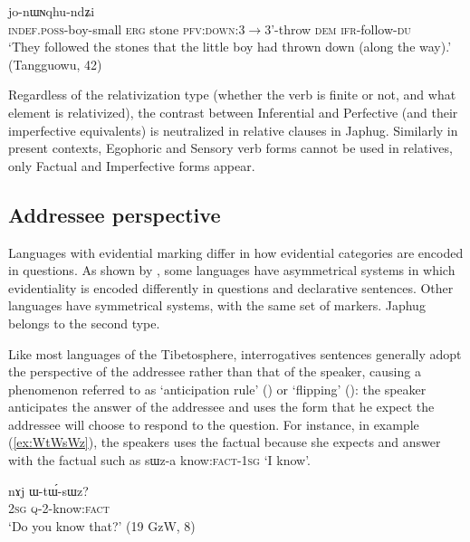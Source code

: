 \documentclass[oldfontcommands,oneside,a4paper,11pt]{article}
\newcommand{\ipa}[1]{{\phon \mbox{#1}}} %
\newcommand{\refb}[1]{(\ref{#1})}
\begin{document}
\begin{exe}
\ex  \label{ex:paBde}
\gll  [\ipa{tɤ-tɕɯ-pɯ} 	\ipa{kɯ} 	\ipa{rdɤstaʁ} 	\ipa{pa-βde}] 	\ipa{nɯ} 	\ipa{jo-nɯɴqhu-ndʑi}  \\
\textsc{indef.poss}-boy-small \textsc{erg} stone \textsc{pfv:down}:3$\rightarrow$3'-throw \textsc{dem} \textsc{ifr}-follow-\textsc{du} \\
\glt `They followed the stones that the little boy had thrown down (along the way).' (Tangguowu, 42)
\end{exe}

Regardless of the relativization type (whether the verb is finite or not, and what element is relativized), the contrast between Inferential and  Perfective (and their imperfective equivalents) is neutralized in relative clauses in Japhug. Similarly in present contexts, Egophoric and Sensory verb forms cannot be used in relatives, only Factual and Imperfective forms appear.

\subsection{Addressee perspective} \label{sec:anticipation}
Languages with evidential marking differ in how evidential categories are encoded in questions. As shown by \citet{sanroque15interrogativity}, some languages have asymmetrical systems in which evidentiality is encoded differently in questions and declarative sentences. Other languages have symmetrical systems, with the same set of markers. Japhug belongs to the second type. 

Like most languages of the Tibetosphere, interrogatives sentences generally adopt the perspective of the addressee rather than that of the speaker, causing a phenomenon referred to as `anticipation rule' (\citealt[244]{tournadre14evidentiality}) or `flipping' (\citealt{sanroque15interrogativity}):   the speaker anticipates the answer of the addressee and uses the form that he expect the addressee will choose to respond to the question. For instance, in example \refb{ex:WtWsWz}, the speakers uses the factual because she expects and answer with the factual such as \ipa{sɯz-a} know:\textsc{fact}-\textsc{1sg} `I know'.

\begin{exe}
\ex \label{ex:WtWsWz}
\gll 
\ipa{nɤj}	\ipa{ɯ-tɯ́-sɯz?} \\
\textsc{2sg} \textsc{q}-2-know:\textsc{fact} \\
\glt `Do you know that?' (19 GzW, 8)
\end{exe}
\end{document}
